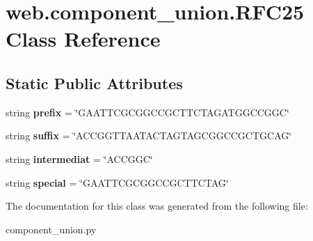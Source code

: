 \hypertarget{classweb_1_1component__union_1_1_r_f_c25}{\section{web.\-component\-\_\-union.\-R\-F\-C25 Class Reference}
\label{classweb_1_1component__union_1_1_r_f_c25}
}
\subsection*{Static Public Attributes}
\begin{DoxyCompactItemize}
\item 
\hypertarget{classweb_1_1component__union_1_1_r_f_c25_a587bc92d42da35b284da4ed8640671b4}{string {\bfseries prefix} = \char`\"{}G\-A\-A\-T\-T\-C\-G\-C\-G\-G\-C\-C\-G\-C\-T\-T\-C\-T\-A\-G\-A\-T\-G\-G\-C\-C\-G\-G\-C\char`\"{}}\label{classweb_1_1component__union_1_1_r_f_c25_a587bc92d42da35b284da4ed8640671b4}

\item 
\hypertarget{classweb_1_1component__union_1_1_r_f_c25_aa03490fe92d2f1fcd5d2e80ff4e7f0ef}{string {\bfseries suffix} = \char`\"{}A\-C\-C\-G\-G\-T\-T\-A\-A\-T\-A\-C\-T\-A\-G\-T\-A\-G\-C\-G\-G\-C\-C\-G\-C\-T\-G\-C\-A\-G\char`\"{}}\label{classweb_1_1component__union_1_1_r_f_c25_aa03490fe92d2f1fcd5d2e80ff4e7f0ef}

\item 
\hypertarget{classweb_1_1component__union_1_1_r_f_c25_aa0147ee39e138732307cb519eb0f1bd2}{string {\bfseries intermediat} = \char`\"{}A\-C\-C\-G\-G\-C\char`\"{}}\label{classweb_1_1component__union_1_1_r_f_c25_aa0147ee39e138732307cb519eb0f1bd2}

\item 
\hypertarget{classweb_1_1component__union_1_1_r_f_c25_a8a8f68d525379ed3db9ab285a202d4fc}{string {\bfseries special} = \char`\"{}G\-A\-A\-T\-T\-C\-G\-C\-G\-G\-C\-C\-G\-C\-T\-T\-C\-T\-A\-G\char`\"{}}\label{classweb_1_1component__union_1_1_r_f_c25_a8a8f68d525379ed3db9ab285a202d4fc}

\end{DoxyCompactItemize}


The documentation for this class was generated from the following file\-:\begin{DoxyCompactItemize}
\item 
component\-\_\-union.\-py\end{DoxyCompactItemize}
